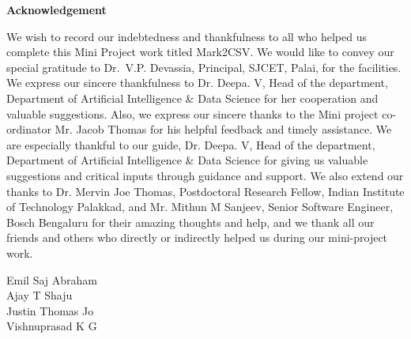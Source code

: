 \thispagestyle{empty}
\begin{center}
  \vspace*{1cm}
  \textbf{\large Acknowledgement}
\end{center}
We wish to record our indebtedness and thankfulness to all who helped us complete this Mini Project work titled Mark2CSV. We would like to convey our special gratitude to Dr.~V.P. Devassia, Principal, SJCET, Palai, for the facilities. We express our sincere thankfulness to Dr. Deepa. V, Head of the department, Department of Artificial Intelligence \& Data Science for her cooperation and valuable suggestions. Also, we express our sincere thanks to the Mini project co-ordinator Mr. Jacob Thomas for his helpful feedback and timely assistance.
We are especially thankful to our guide, Dr. Deepa. V, Head of the department, Department of Artificial Intelligence \& Data Science for giving us valuable suggestions and critical inputs through guidance and support. We also extend our thanks to Dr. Mervin Joe Thomas, Postdoctoral Research Fellow, Indian Institute of Technology Palakkad, and Mr. Mithun M Sanjeev, Senior Software Engineer, Bosch Bengaluru for their amazing thoughts and help, and we thank all our friends and others who directly or indirectly helped us during our mini-project work.
 \\
\begin{flushright}
Emil Saj Abraham \\
Ajay T Shaju \\
Justin Thomas Jo \\
Vishnuprasad K G
\end{flushright}






\newpage

